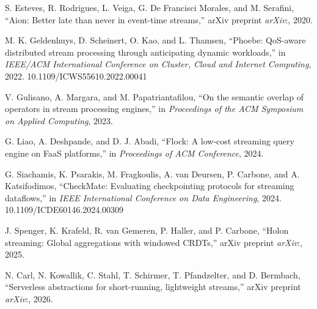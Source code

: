  S. Esteves, R. Rodrigues, L. Veiga, G. De Francisci Morales, and M. Serafini, ``Aion: Better late than never in event-time streams,'' arXiv preprint \emph{arXiv}:, 2020.

 M. K. Geldenhuys, D. Scheinert, O. Kao, and L. Thamsen, ``Phoebe: QoS-aware distributed stream processing through anticipating dynamic workloads,'' in \emph{IEEE/ACM International Conference on Cluster, Cloud and Internet Computing}, 2022. 10.1109/ICWS55610.2022.00041

 V. Gulisano, A. Margara, and M. Papatriantafilou, ``On the semantic overlap of operators in stream processing engines,'' in \emph{Proceedings of the ACM Symposium on Applied Computing}, 2023.

 G. Liao, A. Deshpande, and D. J. Abadi, ``Flock: A low-cost streaming query engine on FaaS platforms,'' in \emph{Proceedings of ACM Conference}, 2024.

 G. Siachamis, K. Psarakis, M. Fragkoulis, A. van Deursen, P. Carbone, and A. Katsifodimos, ``CheckMate: Evaluating checkpointing protocols for streaming dataflows,'' in \emph{IEEE International Conference on Data Engineering}, 2024. 10.1109/ICDE60146.2024.00309

 J. Spenger, K. Krafeld, R. van Gemeren, P. Haller, and P. Carbone, ``Holon streaming: Global aggregations with windowed CRDTs,'' arXiv preprint \emph{arXiv}:, 2025.

 N. Carl, N. Kowallik, C. Stahl, T. Schirmer, T. Pfandzelter, and D. Bermbach, ``Serverless abstractions for short-running, lightweight streams,'' arXiv preprint \emph{arXiv}:, 2026.


